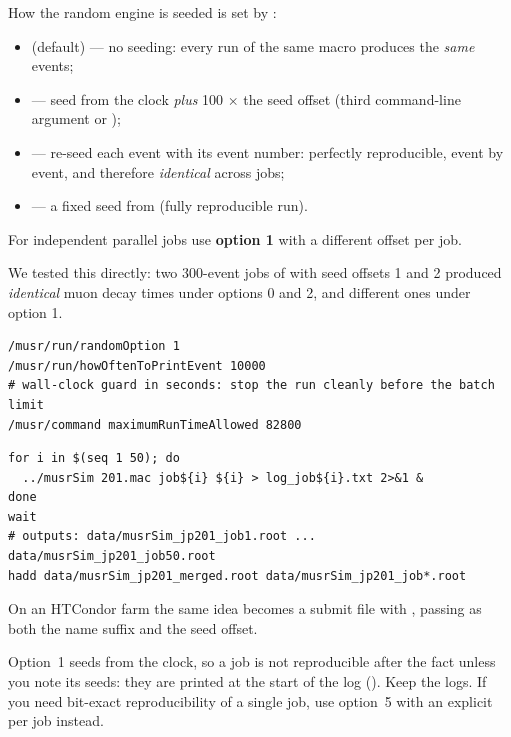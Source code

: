 \begin{keypoint}
How the random engine is seeded is set by :
\begin{itemize}
  \item {} (default) --- no seeding: every run of the same macro produces the \emph{same} events;
  \item {} --- seed from the clock \emph{plus} 100 \(\times\) the seed offset (third command-line argument or );
  \item {} --- re-seed each event with its event number: perfectly reproducible, event by event, and therefore \emph{identical} across jobs;
  \item {} --- a fixed seed from  (fully reproducible run).
\end{itemize}
For independent parallel jobs use \textbf{option 1} with a different offset per job.
\end{keypoint}

We tested this directly: two 300-event jobs of  with seed offsets 1 and 2 produced \emph{identical} muon decay times under options 0 and 2, and different ones under option 1.

\begin{lstlisting}[style=mac,caption={Settings for production jobs}]
/musr/run/randomOption 1
/musr/run/howOftenToPrintEvent 10000
# wall-clock guard in seconds: stop the run cleanly before the batch limit
/musr/command maximumRunTimeAllowed 82800
\end{lstlisting}

\begin{lstlisting}[style=sh,caption={A simple job split, then merge with ROOT's \texttt{hadd}}]
for i in $(seq 1 50); do
  ../musrSim 201.mac job${i} ${i} > log_job${i}.txt 2>&1 &
done
wait
# outputs: data/musrSim_jp201_job1.root ... data/musrSim_jp201_job50.root
hadd data/musrSim_jp201_merged.root data/musrSim_jp201_job*.root
\end{lstlisting}

On an HTCondor farm the same idea becomes a submit file with , passing  as both the name suffix and the seed offset.

\begin{pitfall}
Option~1 seeds from the clock, so a job is not reproducible after the fact unless you note its seeds: they are printed at the start of the log (). Keep the logs. If you need bit-exact reproducibility of a single job, use option~5 with an explicit  per job instead.
\end{pitfall}

